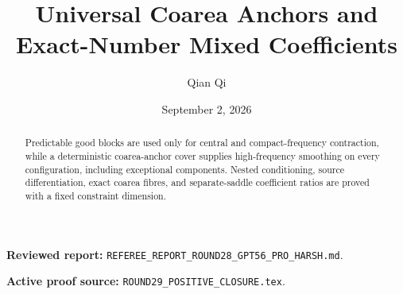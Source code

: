 \documentclass[11pt,reqno]{amsart}
\title[B1 Round 29 revision]{Universal Coarea Anchors and Exact-Number Mixed Coefficients}
\author{Qian Qi}
\date{September 2, 2026}
\begin{document}
\begin{abstract}Predictable good blocks are used only for central and compact-frequency contraction, while a deterministic coarea-anchor cover supplies high-frequency smoothing on every configuration, including exceptional components. Nested conditioning, source differentiation, exact coarea fibres, and separate-saddle coefficient ratios are proved with a fixed constraint dimension.\end{abstract}
\maketitle
\noindent\textbf{Reviewed report:} \texttt{REFEREE\_REPORT\_ROUND28\_GPT56\_PRO\_HARSH.md}.\par
\noindent\textbf{Active proof source:} \texttt{ROUND29\_POSITIVE\_CLOSURE.tex}.\par

\end{document}
